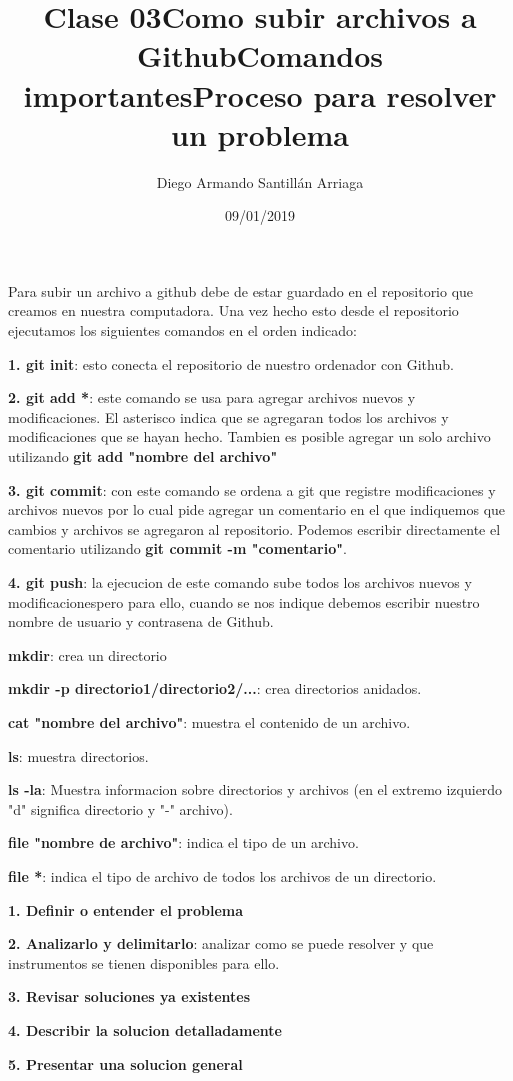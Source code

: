\documentclass[letter paper, 12pt, oneside]{article}
\title{\Huge Clase 03}
\author{Diego Armando Santillán Arriaga}
\date{09/01/2019}
\begin{document}
	\maketitle
\newpage
\title{\huge\textbf{Como subir archivos a Github}}

Para subir un archivo a github debe de estar guardado en el repositorio que creamos en nuestra computadora. Una vez hecho esto desde el repositorio ejecutamos los siguientes comandos en el orden indicado:

 \textbf{1. git init}: esto conecta el repositorio de nuestro ordenador con Github.

\textbf{2. git add *}: este comando se usa para agregar archivos nuevos y modificaciones. El asterisco indica que se agregaran todos los archivos y modificaciones que se hayan hecho. Tambien es posible agregar un solo archivo utilizando \textbf{git add "nombre del archivo"}
 

\textbf{3. git commit}: con este comando se ordena a git que registre modificaciones y archivos nuevos por lo cual pide agregar un comentario en el que indiquemos que cambios y archivos se agregaron al repositorio. Podemos escribir directamente el comentario utilizando \textbf{git commit -m "comentario"}. 

\textbf{4. git push}: la ejecucion de este comando sube todos los archivos nuevos y modificacionespero para ello, cuando se nos indique debemos escribir nuestro nombre de usuario y contrasena de Github.


\title{\huge\textbf{Comandos importantes}}


\textbf{mkdir}: crea un directorio


\textbf{mkdir -p directorio1/directorio2/...}: crea directorios anidados.


\textbf{cat "nombre del archivo"}: muestra el contenido de un archivo.


\textbf{ls}: muestra directorios.


\textbf{ls -la}: Muestra informacion sobre directorios y archivos (en el extremo izquierdo "d" significa directorio y "-" archivo).


\textbf{file "nombre de archivo"}: indica el tipo de un archivo. 

\textbf{file *}: indica el tipo de archivo de todos los archivos de un directorio. 


\title{\huge\textbf{Proceso para resolver un problema}}


\textbf{1. Definir o entender el problema}


\textbf{2. Analizarlo y delimitarlo}: analizar como se puede resolver y que instrumentos se tienen disponibles para ello.


\textbf{3. Revisar soluciones ya existentes}


\textbf{4. Describir la solucion detalladamente}


\textbf{5. Presentar una solucion general}
\end{document}
